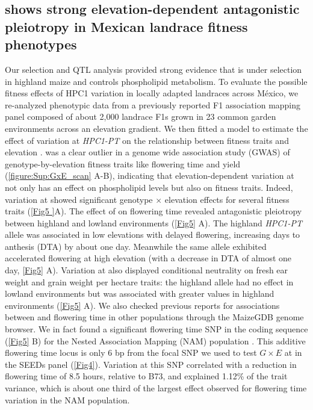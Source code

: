 \subsection{\hpc shows strong elevation-dependent antagonistic pleiotropy in Mexican landrace fitness phenotypes}
Our selection and QTL analysis provided strong evidence that \hpc is under selection in highland maize and controls phospholipid metabolism. 
To evaluate the possible fitness effects of HPC1 variation in locally adapted landraces across M\'exico, we re-analyzed phenotypic data from a previously reported F1 association mapping panel \citep{romero_navarro2017-cn, gates2019-xu} composed of about 2,000 landrace F1s grown in 23 common garden environments across an elevation gradient.  
We then fitted a model to estimate the effect of variation at \textit{HPC1-PT} on the relationship between fitness traits and elevation \citep{runcie2019-gr}.
\hpc was a clear outlier in a genome wide association study (GWAS) of genotype-by-elevation fitness traits like flowering time and yield (\autoref{figure:Sup:GxE_scan} A-B), indicating that elevation-dependent variation at \hpc not only has an effect on phospholipid levels but also on fitness traits.
Indeed, variation at \hpc showed significant genotype $\times$ elevation effects for several fitness traits (\autoref{Fig5 }A). 
The effect of \hpc on flowering time revealed antagonistic pleiotropy between highland and lowland environments (\autoref{Fig5} A). 
The highland \textit{HPC1-PT} allele was associated in low elevations with delayed flowering, increasing days to anthesis (DTA) by about one day.
Meanwhile the same allele exhibited accelerated flowering at high elevation (with a decrease in DTA of almost one day, \autoref{Fig5} A).
Variation at \hpc also displayed conditional neutrality on fresh ear weight and grain weight per hectare traits: the highland allele had no effect in lowland environments but was associated with greater values in highland environments (\autoref{Fig5} A).
We also checked previous reports for associations between \hpc and flowering time in other populations through the MaizeGDB \citep{woodhouse2021-wd} genome browser. 
We in fact found a significant flowering time SNP in the \hpc coding sequence (\autoref{Fig5} B) for the Nested Association Mapping (NAM) population \citep{wallace2014-yy}. 
This additive flowering time locus is only 6 bp from the focal SNP we used to test  $G \times E$ at \hpc in the SEEDs panel (\autoref{Fig4}). 
Variation at this SNP correlated with a reduction in flowering time of 8.5 hours, relative to B73, and explained 1.12\% of the trait variance, which is about one third of the largest effect observed for flowering time variation in the NAM population. 

